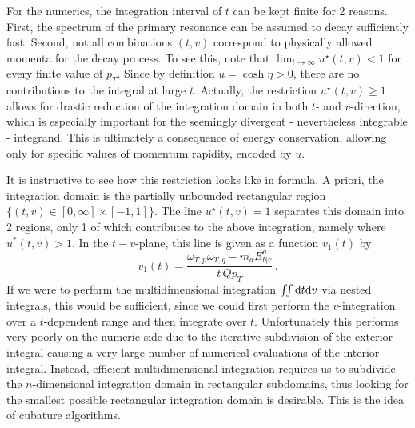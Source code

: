 For the numerics, the integration interval of $t$ can be kept finite for 2 reasons. First, the spectrum of the primary resonance can be assumed to decay sufficiently fast. Second, not all combinations ${(t,v)}$ correspond to physically allowed momenta for the decay process. To see this, note that ${\lim_{t\to\infty}u^\star(t,v)<1}$ for every finite value of $p_T$. Since by definition ${u=\cosh\eta>0}$, there are no contributions to the integral at large $t$. Actually, the restriction ${u^\star(t,v)\geq 1}$ allows for drastic reduction of the integration domain in both $t$- and $v$-direction, which is especially important for the seemingly divergent - nevertheless integrable - integrand. This is ultimately a consequence of energy conservation, allowing only for specific values of momentum rapidity, encoded by $u$.

It is instructive to see how this restriction looks like in formula. A priori, the integration domain is the partially unbounded rectangular region ${\{(t,v)\in[0,\infty]\times[-1,1]\}}$. The line ${u^\star(t,v)=1}$ separates this domain into 2 regions, only 1 of which contributes to the above integration, namely where ${u^*(t,v)>1}$. In the $t-v$-plane, this line is given as a function ${v_1(t)}$ by
\begin{equation}
    v_1(t)=\frac{\omega_{T,p}\omega_{T,q}-m_aE^a_{b\vert c}}{t\,Qp_T}\,.
    \label{eq:DecayCalc_v1t}
\end{equation}
If we were to perform the multidimensional integration ${\iint\text{d} t\text{d} v}$ via nested integrals, this would be sufficient, since we could first perform the $v$-integration over a $t$-dependent range and then integrate over $t$. Unfortunately this performs very poorly on the numeric side due to the iterative subdivision of the exterior integral causing a very large number of numerical evaluations of the interior integral. Instead, efficient multidimensional integration requires us to subdivide the $n$-dimensional integration domain in rectangular subdomains, thus looking for the smallest possible rectangular integration domain is desirable. This is the idea of cubature algorithms.

